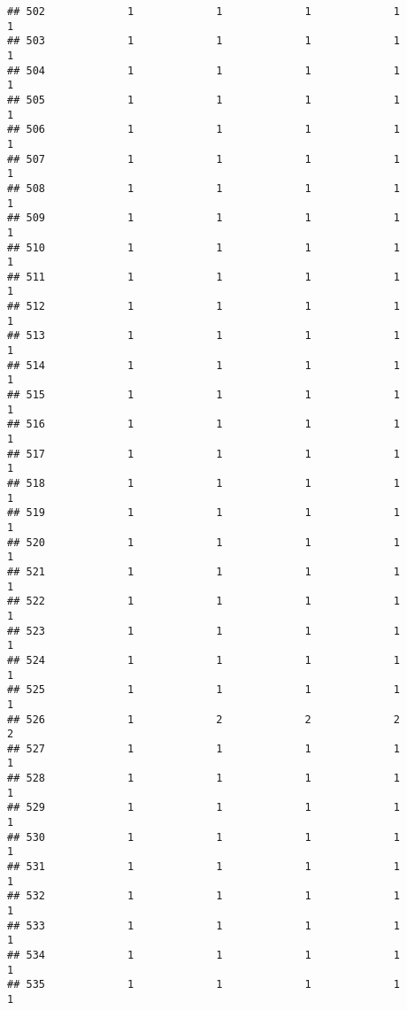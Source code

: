 \documentclass[
]{article}
\begin{document}
\begin{verbatim}
## 502             1             1             1             1             1
## 503             1             1             1             1             1
## 504             1             1             1             1             1
## 505             1             1             1             1             1
## 506             1             1             1             1             1
## 507             1             1             1             1             1
## 508             1             1             1             1             1
## 509             1             1             1             1             1
## 510             1             1             1             1             1
## 511             1             1             1             1             1
## 512             1             1             1             1             1
## 513             1             1             1             1             1
## 514             1             1             1             1             1
## 515             1             1             1             1             1
## 516             1             1             1             1             1
## 517             1             1             1             1             1
## 518             1             1             1             1             1
## 519             1             1             1             1             1
## 520             1             1             1             1             1
## 521             1             1             1             1             1
## 522             1             1             1             1             1
## 523             1             1             1             1             1
## 524             1             1             1             1             1
## 525             1             1             1             1             1
## 526             1             2             2             2             2
## 527             1             1             1             1             1
## 528             1             1             1             1             1
## 529             1             1             1             1             1
## 530             1             1             1             1             1
## 531             1             1             1             1             1
## 532             1             1             1             1             1
## 533             1             1             1             1             1
## 534             1             1             1             1             1
## 535             1             1             1             1             1

\end{verbatim}
\end{document}
